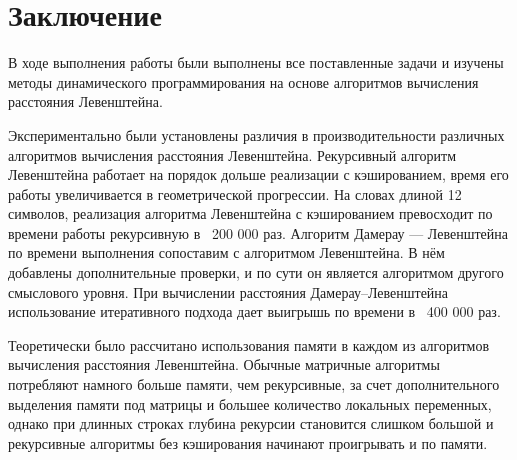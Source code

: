 \chapter*{Заключение}

В ходе выполнения работы были выполнены все поставленные задачи и изучены методы динамического программирования на основе алгоритмов вычисления расстояния Левенштейна.

Экспериментально были установлены различия в производительности различных алгоритмов вычисления расстояния Левенштейна. Рекурсивный алгоритм Левенштейна работает на порядок дольше  реализации с кэшированием, время его работы увеличивается в геометрической прогрессии. На словах длиной 12 символов, реализация алгоритма Левенштейна с кэшированием превосходит по времени работы рекурсивную в ~200 000 раз. Алгоритм Дамерау — Левенштейна по времени выполнения сопоставим с алгоритмом Левенштейна. В нём добавлены дополнительные проверки, и по сути он является алгоритмом другого смыслового уровня. При вычислении расстояния Дамерау--Левенштейна использование итеративного подхода дает выигрышь по времени в ~400 000 раз.

Теоретически было рассчитано использования памяти в каждом из алгоритмов вычисления расстояния Левенштейна. Обычные матричные алгоритмы потребляют намного больше памяти, чем рекурсивные, за счет дополнительного выделения памяти под матрицы и большее количество локальных переменных, однако при длинных строках глубина рекурсии становится слишком большой и рекурсивные алгоритмы без кэширования начинают проигрывать и по памяти.